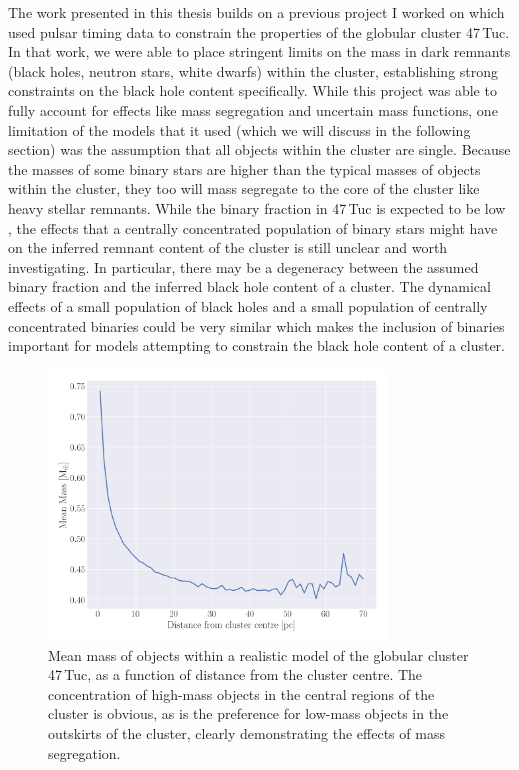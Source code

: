 The work presented in this thesis builds on a previous project I worked on which used pulsar timing
data to constrain the properties of the globular cluster 47\,Tuc. In that work, we were able to
place stringent limits on the mass in dark remnants (black holes, neutron stars, white dwarfs)
within the cluster, establishing strong constraints on the black hole content specifically. While
this project was able to fully account for effects like mass segregation and uncertain mass
functions, one limitation of the models that it used (which we will discuss in the following
section) was the assumption that all objects within the cluster are single. Because the masses of
some binary stars are higher than the typical masses of objects within the cluster, they too will
mass segregate to the core of the cluster like heavy stellar remnants. While the binary fraction in
47\,Tuc is expected to be low \citep{Milone2012}, the effects that a centrally concentrated
population of binary stars might have on the inferred remnant content of the cluster is still
unclear and worth investigating. In particular, there may be a degeneracy between the assumed binary
fraction and the inferred black hole content of a cluster. The dynamical effects of a small population of black
holes and a small population of centrally concentrated binaries could be very similar which makes
the inclusion of binaries important for models attempting to constrain the black hole content of a
cluster.



\begin{figure}
	\centering
	\includegraphics[width=0.8\textwidth]{figures/radial_mean_mass.png}
	\caption{Mean mass of objects within a realistic model of the globular cluster 47\,Tuc, as a
		function of distance from the cluster centre. The concentration of high-mass objects
		in the central regions of the cluster is obvious, as is the preference for low-mass
		objects in the outskirts of the cluster, clearly demonstrating the effects of mass
		segregation.}
	\label{fig:1/radial_mean_mass}
\end{figure}





